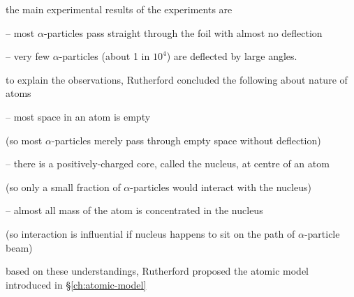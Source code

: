 \cmt the main experimental results of the experiments are

\begin{compactitem}
	\item[--] most $\alpha$-particles pass straight through the foil with almost no deflection
	
	\item[--] very few $\alpha$-particles (about 1 in $10^4$) are deflected by large angles.
\end{compactitem}

\cmt to explain the observations, Rutherford concluded the following about nature of atoms

\begin{compactitem}
	\item[--] most space in an atom is empty
	
	(so most $\alpha$-particles merely pass through empty space without deflection)
	
	\item[--] there is a positively-charged core, called the nucleus, at centre of an atom
	
	(so only a small fraction of $\alpha$-particles would interact with the nucleus)
	
	\item[--] almost all mass of the atom is concentrated in the nucleus
	
	(so interaction is influential if nucleus happens to sit on the path of $\alpha$-particle beam)
\end{compactitem}

based on these understandings, Rutherford proposed the atomic model introduced in \S\ref{ch:atomic-model}


